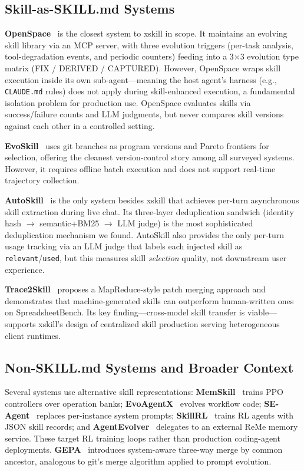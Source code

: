 \documentclass[11pt]{article}
\begin{document}
\subsection{Skill-as-SKILL.md Systems}

\textbf{OpenSpace}~\citep{hku2025openspace} is the closest system to xskill in scope. It maintains an evolving skill library via an MCP server, with three evolution triggers (per-task analysis, tool-degradation events, and periodic counters) feeding into a 3$\times$3 evolution type matrix (FIX / DERIVED / CAPTURED). However, OpenSpace wraps skill execution inside its own sub-agent---meaning the host agent's harness (e.g., \texttt{CLAUDE.md} rules) does not apply during skill-enhanced execution, a fundamental isolation problem for production use. OpenSpace evaluates skills via success/failure counts and LLM judgments, but never compares skill versions against each other in a controlled setting.

\textbf{EvoSkill}~\citep{sentient2025evoskill} uses git branches as program versions and Pareto frontiers for selection, offering the cleanest version-control story among all surveyed systems. However, it requires offline batch execution and does not support real-time trajectory collection.

\textbf{AutoSkill}~\citep{ecnu2025autoskill} is the only system besides xskill that achieves per-turn asynchronous skill extraction during live chat. Its three-layer deduplication sandwich (identity hash $\to$ semantic+BM25 $\to$ LLM judge) is the most sophisticated deduplication mechanism we found. AutoSkill also provides the only per-turn usage tracking via an LLM judge that labels each injected skill as \texttt{relevant}/\texttt{used}, but this measures skill \emph{selection} quality, not downstream user experience.

\textbf{Trace2Skill}~\citep{alibaba2025trace2skill} proposes a MapReduce-style patch merging approach and demonstrates that machine-generated skills can outperform human-written ones on SpreadsheetBench. Its key finding---cross-model skill transfer is viable---supports xskill's design of centralized skill production serving heterogeneous client runtimes.

\subsection{Non-SKILL.md Systems and Broader Context}

Several systems use alternative skill representations: \textbf{MemSkill}~\citep{memskill2025} trains PPO controllers over operation banks; \textbf{EvoAgentX}~\citep{evoagentx2025} evolves workflow code; \textbf{SE-Agent}~\citep{seagent2025} replaces per-instance system prompts; \textbf{SkillRL}~\citep{skillrl2025} trains RL agents with JSON skill records; and \textbf{AgentEvolver}~\citep{agentevolver2025} delegates to an external ReMe memory service. These target RL training loops rather than production coding-agent deployments. \textbf{GEPA}~\citep{gepa2025} introduces system-aware three-way merge by common ancestor, analogous to git's merge algorithm applied to prompt evolution.
\end{document}
